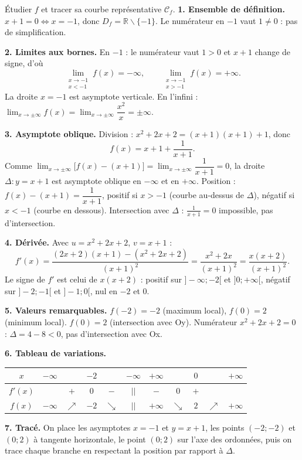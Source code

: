 \documentclass[11pt]{article}
\def\setminus{\mathbin{\backslash}}\let\smallsetminus\setminus
\begin{document}
\begin{exoresolu}[Étude complète de $f(x)=\dfrac{x^2+2x+2}{x+1}$]
Étudier $f$ et tracer sa courbe représentative $\mathcal{C}_f$.
\tcblower
\textbf{1. Ensemble de définition.} $x+1=0\iff x=-1$, donc $D_f=\mathbb{R}\setminus\{-1\}$. Le numérateur en $-1$ vaut $1\neq0$ : pas de simplification.

\textbf{2. Limites aux bornes.}
En $-1$ : le numérateur vaut $1>0$ et $x+1$ change de signe, d'où
\[ \lim_{\substack{x\to -1\\ x<-1}}f(x)=-\infty, \qquad \lim_{\substack{x\to -1\\ x>-1}}f(x)=+\infty. \]
La droite $x=-1$ est asymptote verticale.
En l'infini : $\displaystyle\lim_{x\to\pm\infty}f(x)=\lim_{x\to\pm\infty}\dfrac{x^2}{x}=\pm\infty$.

\textbf{3. Asymptote oblique.} Division : $x^2+2x+2=(x+1)(x+1)+1$, donc
\[ f(x)=x+1+\dfrac{1}{x+1}. \]
Comme $\displaystyle\lim_{x\to\pm\infty}\bigl[f(x)-(x+1)\bigr]=\lim_{x\to\pm\infty}\dfrac{1}{x+1}=0$, la droite $\Delta : y=x+1$ est asymptote oblique en $-\infty$ et en $+\infty$.
Position : $f(x)-(x+1)=\dfrac{1}{x+1}$, positif si $x>-1$ (courbe au-dessus de $\Delta$), négatif si $x<-1$ (courbe en dessous).
Intersection avec $\Delta$ : $\frac{1}{x+1}=0$ impossible, pas d'intersection.

\textbf{4. Dérivée.} Avec $u=x^2+2x+2$, $v=x+1$ :
\[ f'(x)=\dfrac{(2x+2)(x+1)-(x^2+2x+2)}{(x+1)^2}=\dfrac{x^2+2x}{(x+1)^2}=\dfrac{x(x+2)}{(x+1)^2}. \]
Le signe de $f'$ est celui de $x(x+2)$ : positif sur $]-\infty;-2[$ et $]0;+\infty[$, négatif sur $]-2;-1[$ et $]-1;0[$, nul en $-2$ et $0$.

\textbf{5. Valeurs remarquables.} $f(-2)=-2$ (maximum local), $f(0)=2$ (minimum local). $f(0)=2$ (intersection avec Oy). Numérateur $x^2+2x+2=0$ : $\Delta=4-8<0$, pas d'intersection avec Ox.

\textbf{6. Tableau de variations.}
\begin{center}
\begin{tabular}{|c|cccc|c||c|cccc|}
\hline
$x$ & $-\infty$ & & $-2$ & & $-\infty$ & $+\infty$ & & $0$ & & $+\infty$\\
\hline
$f'(x)$ & & $+$ & $0$ & $-$ & $||$ & $-$ & $0$ & $+$ & & \\
\hline
$f(x)$ & $-\infty$ & $\nearrow$ & $-2$ & $\searrow$ & $||$ & $+\infty$ & $\searrow$ & $2$ & $\nearrow$ & $+\infty$\\
\hline
\end{tabular}
\end{center}

\textbf{7. Tracé.} On place les asymptotes $x=-1$ et $y=x+1$, les points $(-2;-2)$ et $(0;2)$ à tangente horizontale, le point $(0;2)$ sur l'axe des ordonnées, puis on trace chaque branche en respectant la position par rapport à $\Delta$.
\end{exoresolu}
\end{document}
